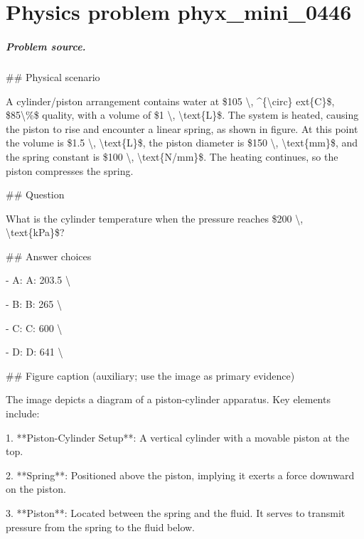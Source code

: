 
\chapter{Physics problem phyx\_mini\_0446}
\label{ch:PhyXMiniProblems_problem_phyx_mini_0446}

\paragraph{Problem source.}
\#\# Physical scenario

A cylinder/piston arrangement contains water at \$105 \textbackslash{}, \textasciicircum{}\{\textbackslash{}circ\}	ext\{C\}\$, \$85\textbackslash{}\%\$ quality, with a volume of \$1 \textbackslash{}, \textbackslash{}text\{L\}\$. The system is heated, causing the piston to rise and encounter a linear spring, as shown in figure. At this point the volume is \$1.5 \textbackslash{}, \textbackslash{}text\{L\}\$, the piston diameter is \$150 \textbackslash{}, \textbackslash{}text\{mm\}\$, and the spring constant is \$100 \textbackslash{}, \textbackslash{}text\{N/mm\}\$. The heating continues, so the piston compresses the spring.

\#\# Question

What is the cylinder temperature when the pressure reaches \$200 \textbackslash{}, \textbackslash{}text\{kPa\}\$?

\#\# Answer choices

- A: A: 203.5 \textbackslash{}

- B: B: 265 \textbackslash{}

- C: C: 600 \textbackslash{}

- D: D: 641 \textbackslash{}

\#\# Figure caption (auxiliary; use the image as primary evidence)

The image depicts a diagram of a piston-cylinder apparatus. Key elements include:

1. **Piston-Cylinder Setup**: A vertical cylinder with a movable piston at the top.
   
2. **Spring**: Positioned above the piston, implying it exerts a force downward on the piston.

3. **Piston**: Located between the spring and the fluid. It serves to transmit pressure from the spring to the fluid below.


